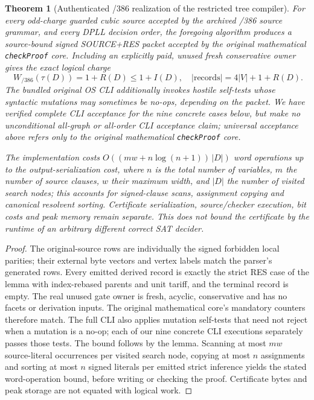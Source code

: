 \documentclass[11pt]{article}
\newtheorem{theorem}{Theorem}
\begin{document}
\begin{theorem}[Authenticated /386 realization of the restricted tree compiler]
For every odd-charge guarded cubic source accepted by the archived /386 source grammar, and every DPLL decision order, the foregoing algorithm produces a source-bound signed SOURCE+RES packet accepted by the original mathematical \texttt{checkProof} core. Including an explicitly paid, unused fresh conservative owner gives the exact logical charge
\[
\boxed{\quad W_{/386}(\tau(D))=1+R(D)\le 1+I(D),\quad
|\mathrm{records}|=4|V|+1+R(D).\quad}
\]
The bundled original OS CLI additionally invokes hostile self-tests whose syntactic mutations may sometimes be no-ops, depending on the packet. We have verified complete CLI acceptance for the nine concrete cases below, but make no unconditional all-graph or all-order \emph{CLI} acceptance claim; universal acceptance above refers only to the original mathematical \texttt{checkProof} core.\par
The implementation costs $O((mw+n\log(n+1))\,|D|)$ word operations up to the output-serialization cost, where $n$ is the total number of variables, $m$ the number of source clauses, $w$ their maximum width, and $|D|$ the number of visited search nodes; this accounts for signed-clause scans, assignment copying and canonical resolvent sorting. Certificate serialization, source/checker execution, bit costs and peak memory remain separate. This does not bound the certificate by the runtime of an \emph{arbitrary different} correct SAT decider.
\end{theorem}
\begin{proof}
The original-source rows are individually the signed forbidden local parities; their external byte vectors and vertex labels match the parser's generated rows. Every emitted derived record is exactly the strict RES case of the lemma with index-rebased parents and unit tariff, and the terminal record is empty. The real unused gate owner is fresh, acyclic, conservative and has no facets or derivation inputs. The original mathematical core's mandatory counters therefore match. The full CLI also applies mutation self-tests that need not reject when a mutation is a no-op; each of our nine concrete CLI executions separately passes those tests. The bound follows by the lemma. Scanning at most $mw$ source-literal occurrences per visited search node, copying at most $n$ assignments and sorting at most $n$ signed literals per emitted strict inference yields the stated word-operation bound, before writing or checking the proof. Certificate bytes and peak storage are not equated with logical work.
\end{proof}
\end{document}
